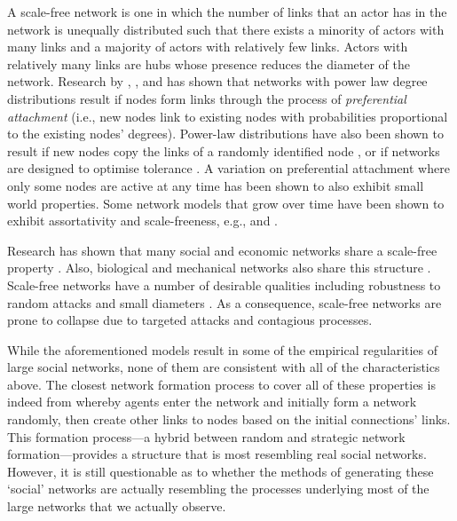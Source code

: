A scale-free network is one in which the number of links that an actor has in the network is unequally distributed such that there exists a minority of actors with many links and a majority of actors with relatively few links. Actors with relatively many links are hubs whose presence reduces the diameter of the network. Research by \citet{Price1976}, \citet{BarabasiAlbert1999}, and \citet{CooperFrieze2003} has shown that networks with power law degree distributions result if nodes form links through the process of \emph{preferential attachment} (i.e., new nodes link to existing nodes with probabilities proportional to the existing nodes' degrees). Power-law distributions have also been shown to result if new nodes copy the links of a randomly identified node \citep{Kleinberg1999, Kumar2000}, or if networks are designed to optimise tolerance \citep{Fabrikant2003}. A variation on preferential attachment where only some nodes are active at any time \citep{Klemm2002a} has been shown to also exhibit small world properties. Some network models that grow over time have been shown to exhibit assortativity and scale-freeness, e.g., \citet{Callaway2001} and \citet{Krapivsky2002}.

Research has shown that many social and economic networks share a scale-free property \citep{Faloutsos1999, DorogovtsevMendes2003, Barabasi2009, Barabasi2012}. Also, biological and mechanical networks also share this structure \citep{Barabasi2011}. Scale-free networks have a number of desirable qualities including robustness to random attacks and small diameters \citep{AlbertJeongBarabasi1999, AlbertJeongBarabasi2000}. As a consequence, scale-free networks are prone to collapse due to targeted attacks and contagious processes.

While the aforementioned models result in some of the empirical regularities of large social networks, none of them are consistent with all of the characteristics above. The closest network formation process to cover all of these properties is indeed from \citet{JacksonRogers2007} whereby agents enter the network and initially form a network randomly, then create other links to nodes based on the initial connections' links. This formation process---a hybrid between random and strategic network formation---provides a structure that is most resembling real social networks. However, it is still questionable as to whether the methods of generating these `social' networks are actually resembling the processes underlying most of the large networks that we actually observe.

